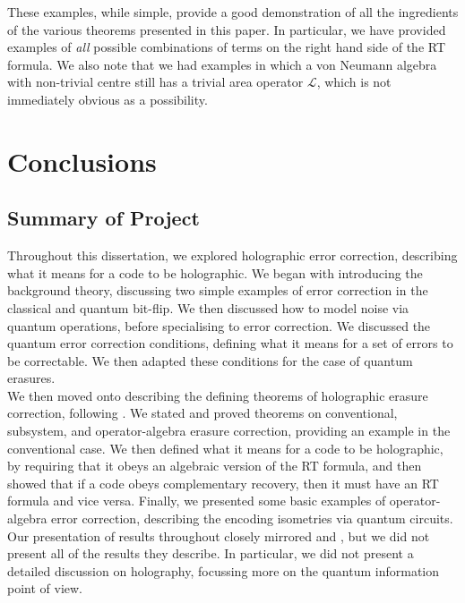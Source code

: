 \documentclass[12pt,a4paper]{report}
\numberwithin{equation}{section}
\theoremstyle{definition}
\theoremstyle{theorem}
\theoremstyle{theorem}
\theoremstyle{example}
\theoremstyle{definition}
\begin{document}
These examples, while simple, provide a good demonstration of all the ingredients of the various theorems presented in this paper. In particular, we have provided examples of \textit{all} possible combinations of terms on the right hand side of the RT formula. We also note that we had examples in which a von Neumann algebra with non-trivial centre still has a trivial area operator $\mathcal{L}$, which is not immediately obvious as a possibility. 

\chapter{Conclusions}

\section{Summary of Project}
Throughout this dissertation, we explored holographic error correction, describing what it means for a code to be holographic. We began with introducing the background theory, discussing two simple examples of error correction in the classical and quantum bit-flip. We then discussed how to model noise via quantum operations, before specialising to error correction. We discussed the quantum error correction conditions, defining what it means for a set of errors to be correctable. We then adapted these conditions for the case of quantum erasures.\\
We then moved onto describing the defining theorems of holographic erasure correction, following \cite{Harlow}. We stated and proved theorems on conventional, subsystem, and operator-algebra erasure correction, providing an example in the conventional case. We then defined what it means for a code to be holographic, by requiring that it obeys an algebraic version of the RT formula, and then showed that if a code obeys complementary recovery, then it must have an RT formula and vice versa. Finally, we presented some basic examples of operator-algebra error correction, describing the encoding isometries via quantum circuits.\\
Our presentation of results throughout closely mirrored  \cite{Harlow} and \cite{Pollack}, but we did not present all of the results they describe. In particular, we did not present a detailed discussion on holography, focussing more on the quantum information point of view.
\end{document}
